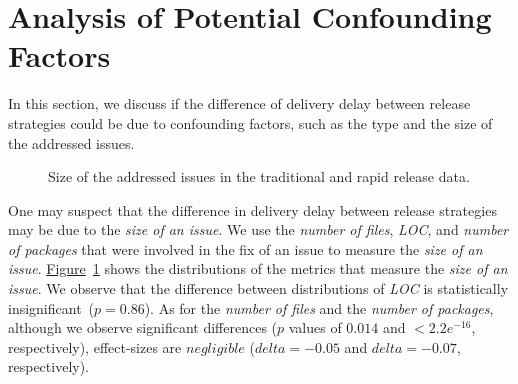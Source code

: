 \section{Analysis of Potential Confounding Factors} \label{sec:discussion}
In this section, we discuss if the difference of delivery delay between release
strategies could be due to confounding factors, such as the type and the size of
the addressed issues.\\
\begin{figure}
	\centering
	\caption{Size of the addressed issues in the traditional and rapid release data.}
	\label{fig:issue_granularity}
\end{figure}

\noindent{}
One may suspect that the difference in delivery delay between release
strategies may be due to the \textit{size of an issue}. We use the
\textit{number of files}, \textit{LOC}, and \textit{number of packages} that
were involved in the fix of an issue to measure the \textit{size of an issue}.
\hyperref[fig:issue_granularity]{Figure}~\ref{fig:issue_granularity} shows the
distributions of the metrics that measure the \textit{size of an issue}.  We
observe that the difference between distributions of \textit{LOC} is
statistically insignificant~($p=0.86$). As for the \textit{number of files} and
the \textit{number of packages}, although we observe significant differences
($p$ values of $0.014$ and $<2.2e^{-16}$, respectively), effect-sizes are
$negligible$ ($delta=-0.05$ and $delta=-0.07$, respectively).\\

